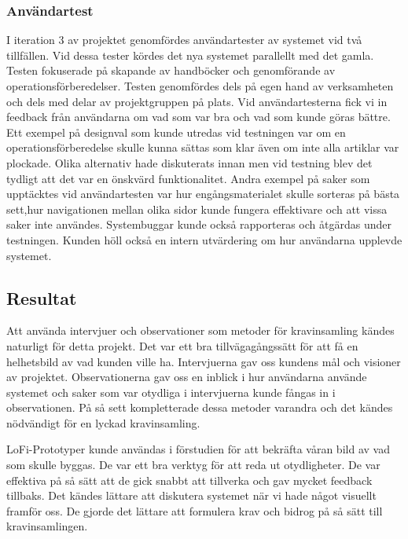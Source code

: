 \subsubsection{Användartest}
I iteration 3 av projektet genomfördes användartester av systemet vid två tillfällen. Vid dessa tester kördes det nya systemet parallellt med det gamla. Testen fokuserade på skapande av handböcker och genomförande av operationsförberedelser. Testen genomfördes dels på egen hand av verksamheten och dels med delar av projektgruppen på plats. Vid användartesterna fick vi in feedback från användarna om vad som var bra och vad som kunde göras bättre. Ett exempel på designval som kunde utredas vid testningen var om en operationsförberedelse skulle kunna sättas som klar även om inte alla artiklar var plockade. Olika alternativ hade diskuterats innan men vid testning blev det tydligt att det var en önskvärd funktionalitet. Andra exempel på saker som upptäcktes vid användartesten var hur engångsmaterialet skulle sorteras på bästa sett,hur navigationen mellan olika sidor kunde fungera effektivare och att vissa saker inte användes.
Systembuggar kunde också rapporteras och åtgärdas under testningen.
Kunden höll också en intern utvärdering om hur användarna upplevde systemet.


\subsection{Resultat}
Att använda intervjuer och observationer som metoder för kravinsamling kändes naturligt för detta projekt. Det var ett bra tillvägagångssätt för att få en helhetsbild av vad kunden ville ha. Intervjuerna gav oss kundens mål och visioner av projektet. Observationerna gav oss en inblick i hur användarna använde systemet och saker som var otydliga i intervjuerna kunde fångas in i observationen. På så sett kompletterade dessa metoder varandra och det kändes nödvändigt för en lyckad kravinsamling.

LoFi-Prototyper kunde användas i förstudien för att bekräfta våran bild av vad som skulle byggas. De var ett bra verktyg för att reda ut otydligheter. De var effektiva på så sätt att de gick snabbt att tillverka och gav mycket feedback tillbaks. Det kändes lättare att diskutera systemet när vi hade något visuellt framför oss. De gjorde det lättare att formulera krav och bidrog på så sätt till kravinsamlingen.


